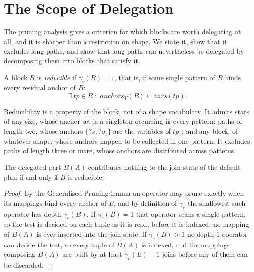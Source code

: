 %

\section{The Scope of Delegation}

The pruning analysis gives a criterion for which blocks are worth delegating at all, and
it is sharper than a restriction on shape. We state it, show that it excludes long paths,
and show that long paths can nevertheless be delegated by decomposing them into blocks
that satisfy it.

\begin{definition}
A block $B$ is \emph{reducible} if $\gamma_c(B) = 1$, that is, if some single pattern of
$B$ binds every residual anchor of $B$:
\[
\exists\, tp \in B \;:\; \mathit{anchors}_V(B) \subseteq \mathit{vars}(tp).
\]
\end{definition}

Reducibility is a property of the block, not of a shape vocabulary. It admits stars of
any size, whose anchor set is a singleton occurring in every pattern; paths of length
two, whose anchors $\{?s, ?o_1\}$ are the variables of $tp_1$; and any block, of whatever
shape, whose anchors happen to be collected in one pattern. It excludes paths of length
three or more, whose anchors are distributed across patterns.

\begin{theorem}[Characterisation]
The delegated part $B(A)$ contributes nothing to the join state of the default plan if
and only if $B$ is reducible.
\end{theorem}

\begin{proof}
By the Generalised Pruning lemma an operator may prune exactly when its mappings bind
every anchor of $B$, and by definition of $\gamma_c$ the shallowest such operator has
depth $\gamma_c(B)$. If $\gamma_c(B) = 1$ that operator scans a single pattern, so the
test is decided on each tuple as it is read, before it is indexed: no mapping of $B(A)$
is ever inserted into the join state. If $\gamma_c(B) > 1$ no depth-$1$ operator can
decide the test, so every tuple of $B(A)$ is indexed, and the mappings composing $B(A)$
are built by at least $\gamma_c(B) - 1$ joins before any of them can be discarded.
\end{proof}

